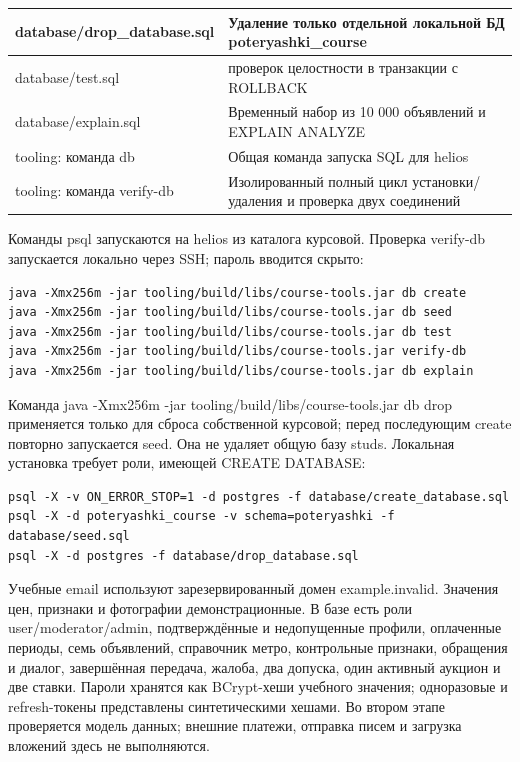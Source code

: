 \begin{longtable}{|>{\RaggedRight\arraybackslash}p{0.30\tablecontentwidth}|>{\RaggedRight\arraybackslash}p{0.70\tablecontentwidth}|}
database/\allowbreak{}drop\_\allowbreak{}database.sql & Удаление только отдельной локальной БД poteryashki\_\allowbreak{}course \\ \hline
database/\allowbreak{}test.sql & 50 проверок целостности в транзакции с ROLLBACK \\ \hline
database/\allowbreak{}explain.sql & Временный набор из 10 000 объявлений и EXPLAIN ANALYZE \\ \hline
tooling: команда db & Общая команда запуска SQL для helios \\ \hline
tooling: команда verify-db & Изолированный полный цикл установки/\allowbreak{}удаления и проверка двух соединений \\ \hline
\end{longtable}
\endgroup

Команды psql запускаются на helios из каталога курсовой. Проверка verify-db запускается локально через SSH; пароль вводится скрыто:

\begin{Verbatim}[breaklines=true,breakanywhere=true,fontsize=\footnotesize]
java -Xmx256m -jar tooling/build/libs/course-tools.jar db create
java -Xmx256m -jar tooling/build/libs/course-tools.jar db seed
java -Xmx256m -jar tooling/build/libs/course-tools.jar db test
java -Xmx256m -jar tooling/build/libs/course-tools.jar verify-db
java -Xmx256m -jar tooling/build/libs/course-tools.jar db explain
\end{Verbatim}

Команда java -Xmx256m -jar tooling/\allowbreak{}build/\allowbreak{}libs/\allowbreak{}course-tools.jar db drop применяется только для сброса собственной курсовой; перед последующим create повторно запускается seed. Она не удаляет общую базу studs. Локальная установка требует роли, имеющей CREATE DATABASE:

\begin{Verbatim}[breaklines=true,breakanywhere=true,fontsize=\footnotesize]
psql -X -v ON_ERROR_STOP=1 -d postgres -f database/create_database.sql
psql -X -d poteryashki_course -v schema=poteryashki -f database/seed.sql
psql -X -d postgres -f database/drop_database.sql
\end{Verbatim}

Учебные email используют зарезервированный домен example.invalid. Значения цен, признаки и фотографии демонстрационные. В базе есть роли user/\allowbreak{}moderator/\allowbreak{}admin, подтверждённые и недопущенные профили, оплаченные периоды, семь объявлений, справочник метро, контрольные признаки, обращения и диалог, завершённая передача, жалоба, два допуска, один активный аукцион и две ставки. Пароли хранятся как BCrypt-хеши учебного значения; одноразовые и refresh-токены представлены синтетическими хешами. Во втором этапе проверяется модель данных; внешние платежи, отправка писем и загрузка вложений здесь не выполняются.


